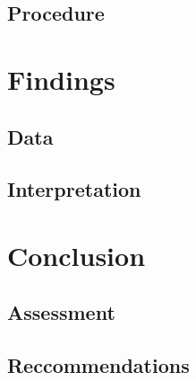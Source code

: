 \documentclass[paper=a4, fontsize=11pt]{scrartcl} %
\numberwithin{equation}{section} %
\numberwithin{figure}{section} %
\begin{document}
\subsection{Procedure}
\section{Findings}
\subsection{Data}
\subsection{Interpretation}
\section{Conclusion}
\subsection{Assessment}
\subsection{Reccommendations}

\printbibliography
\end{document}
